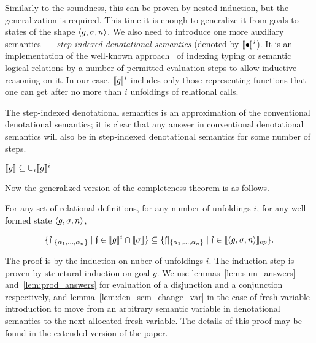 Similarly to the soundness, this can be proven by nested induction, but the generalization is required. This time it is enough to generalize it from goals
to states of the shape $\left<{g, \sigma, n}\right>$. We also need to introduce one more auxiliary semantics~--- \emph{step-indexed denotational semantics} (denoted by $\llbracket{\bullet}\rrbracket^i$). It is an implementation of the well-known approach~\cite{StepIndexing} of indexing typing or semantic logical relations by a number of permitted evaluation steps to allow inductive reasoning on it.
In our case, $\llbracket{g}\rrbracket^i$ includes only those representing functions that one can get after no more than $i$ unfoldings of relational calls.

The step-indexed denotational semantics is an approximation of the conventional denotational semantics; it is clear that any answer in conventional denotational semantics will also be in step-indexed denotational semantics for some number of steps.

\begin{lemma}
$\llbracket{g}\rrbracket \subseteq \cup_i \llbracket{g}\rrbracket^i$
\end{lemma}

Now the generalized version of the completeness theorem is as follows.

\begin{lemma}
\label{lem:gen_completeness}
For any set of relational definitions, for any number of unfoldings $i$, for any well-formed state $\left<{g, \sigma, n}\right>$,

\[
\{\mathfrak{f}|_{\{\alpha_1,\dots,\alpha_n\}} \mid \mathfrak{f} \in \llbracket{g}\rrbracket^i \cap \llbracket{\sigma}\rrbracket\} \subseteq \{\mathfrak{f}|_{\{\alpha_1,\dots,\alpha_n\}} \mid \mathfrak{f} \in \llbracket{\left<{g, \sigma, n}\right>}\rrbracket_{op}\}.
\]
\end{lemma}

The proof is by the induction on nuber of unfoldings $i$. The induction step is proven by structural induction on goal $g$. We use lemmas~\ref{lem:sum_answers} and~\ref{lem:prod_answers} for evaluation of a disjunction and a conjunction respectively, and lemma~\ref{lem:den_sem_change_var} in the case of fresh variable introduction to move from an arbitrary semantic variable in denotational semantics to the next allocated fresh variable. The details of this proof may be found in the extended version of the paper.
